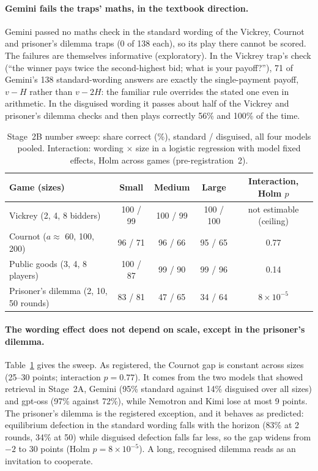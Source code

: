 \documentclass[11pt]{article}
\theoremstyle{definition}
\theoremstyle{remark}
\begin{document}
\paragraph{Gemini fails the traps' maths, in the textbook direction.} Gemini passed no maths
check in the standard wording of the Vickrey, Cournot and prisoner's dilemma traps (0 of 138
each), so its play there cannot be scored. The failures are themselves informative
(exploratory). In the Vickrey trap's check (``the winner pays twice the second-highest bid;
what is your payoff?''), 71 of Gemini's 138 standard-wording answers are exactly the
single-payment payoff, $v-H$ rather than $v-2H$: the familiar rule overrides the stated one even
in arithmetic. In the disguised wording it passes about half of the Vickrey and prisoner's
dilemma checks and then plays correctly 56\% and 100\% of the time.

\begin{table}[t]
\centering
\caption{Stage~2B number sweep: share correct (\%), standard / disguised, all four models pooled.
Interaction: wording $\times$ size in a logistic regression with model fixed effects, Holm
across games (pre-registration~2).}
\label{tab:sweep}
\small
\begin{tabular}{@{}lcccc@{}}
\toprule
Game (sizes) & Small & Medium & Large & Interaction, Holm $p$ \\
\midrule
Vickrey (2, 4, 8 bidders) & 100 / 99 & 100 / 99 & 100 / 100 & not estimable (ceiling) \\
Cournot ($a\approx$ 60, 100, 200) & 96 / 71 & 96 / 66 & 95 / 65 & 0.77 \\
Public goods (3, 4, 8 players) & 100 / 87 & 99 / 90 & 99 / 96 & 0.14 \\
Prisoner's dilemma (2, 10, 50 rounds) & 83 / 81 & 47 / 65 & 34 / 64 & $8\times10^{-5}$ \\
\bottomrule
\end{tabular}
\end{table}

\paragraph{The wording effect does not depend on scale, except in the prisoner's dilemma.}
Table~\ref{tab:sweep} gives the sweep. As registered, the Cournot gap is constant across sizes
(25--30 points; interaction $p=0.77$). It comes from the two models that showed retrieval in
Stage~2A, Gemini (95\% standard against 14\% disguised over all sizes) and gpt-oss (97\% against
72\%), while Nemotron and Kimi lose at most 9 points. The prisoner's dilemma is the registered
exception, and it behaves as predicted: equilibrium defection in the standard wording falls with
the horizon (83\% at 2 rounds, 34\% at 50) while disguised defection falls far less, so the gap
widens from $-2$ to 30 points (Holm $p=8\times10^{-5}$). A long, recognised dilemma reads as an
invitation to cooperate.
\end{document}
